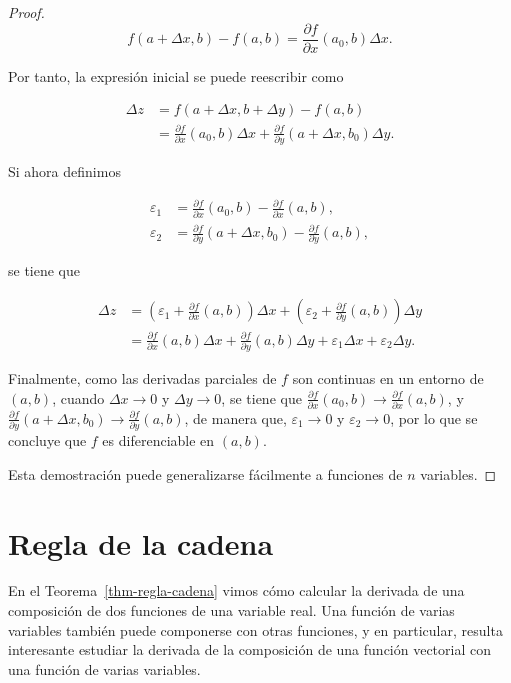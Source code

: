 \documentclass[
  a4paper,
]{scrreport}
\theoremstyle{definition}
\theoremstyle{definition}
\theoremstyle{definition}
\theoremstyle{plain}
\theoremstyle{plain}
\theoremstyle{plain}
\theoremstyle{remark}
\begin{document}
\begin{tcolorbox}
\begin{proof}
\[
f(a+\Delta x, b) - f(a,b) = \frac{\partial f}{\partial x}(a_0, b) \Delta x.
\]

Por tanto, la expresión inicial se puede reescribir como

\begin{align*}
\Delta z 
&= f(a+\Delta x, b+\Delta y) - f(a,b) \\
&= \frac{\partial f}{\partial x}(a_0, b) \Delta x + \frac{\partial f}{\partial y}(a+\Delta x, b_0) \Delta y.
\end{align*}

Si ahora definimos

\begin{align*}
\varepsilon_1 &= \frac{\partial f}{\partial x}(a_0,b)-\frac{\partial f}{\partial x}(a,b),\\
\varepsilon_2 &= \frac{\partial f}{\partial y}(a+\Delta x, b_0)-\frac{\partial f}{\partial y}(a,b),
\end{align*}

se tiene que

\begin{align*}
\Delta z 
&=
\left(\varepsilon_1 + \frac{\partial f}{\partial x}(a, b)\right)\Delta x + \left(\varepsilon_2 + \frac{\partial f}{\partial y}(a, b)\right)\Delta y \\
&= \frac{\partial f}{\partial x}(a, b)\Delta x + \frac{\partial f}{\partial y}(a, b)\Delta y + \varepsilon_1\Delta x + \varepsilon_2\Delta y.
\end{align*}

Finalmente, como las derivadas parciales de \(f\) son continuas en un
entorno de \((a,b)\), cuando \(\Delta x\to 0\) y \(\Delta y\to 0\), se
tiene que
\(\frac{\partial f}{\partial x}(a_0,b)\to \frac{\partial f}{\partial x}(a,b)\),
y
\(\frac{\partial f}{\partial y}(a+\Delta x, b_0)\to \frac{\partial f}{\partial y}(a,b)\),
de manera que, \(\varepsilon_1\to 0\) y \(\varepsilon_2\to 0\), por lo
que se concluye que \(f\) es diferenciable en \((a,b)\).

Esta demostración puede generalizarse fácilmente a funciones de \(n\)
variables.
\end{proof}

\end{tcolorbox}

\section{Regla de la cadena}\label{regla-de-la-cadena-2}

En el Teorema~\ref{thm-regla-cadena} vimos cómo calcular la derivada de
una composición de dos funciones de una variable real. Una función de
varias variables también puede componerse con otras funciones, y en
particular, resulta interesante estudiar la derivada de la composición
de una función vectorial con una función de varias variables.
\end{document}

